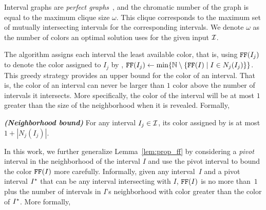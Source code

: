 Interval graphs are \emph{perfect graphs}~\cite{golumbic2004algorithmic}, and the chromatic number of the graph is equal to the maximum clique size $\omega$.
This clique corresponds to the maximum set of mutually intersecting intervals for the corresponding intervals.
We denote $\omega$ as the number of colors an optimal solution uses for the given input $\mathcal{I}$.


\medskip

The \ff algorithm assigns each interval the least available color, that is, using $\text{\texttt{FF}}(I_j)$ to denote the color assigned to $I_j$ by \ff,
$\text{\texttt{FF}}(I_j) \leftarrow \min \{ \mathbb{N} \setminus \{ \text{\texttt{FF}}(I) \mid I \in N_j(I_j) \} \}$.
%
This greedy strategy provides an upper bound for the color of an interval.
That is, the color of an interval can never be larger than $1$ color above the number of intervals it intersects.
More specifically, the color of the interval will be at most $1$ greater than the size of the neighborhood when it is revealed. 
Formally,

\begin{lemma}\emph{\textbf{(Neighborhood bound)}}
    \label{lem:prop_ff}
    For any interval $I_j \in \mathcal{I}$, its color assigned by \ff is at most $1 + |N_j(I_j)|$.
\end{lemma}

In this work, we further generalize Lemma~\ref{lem:prop_ff} by considering a \emph{pivot} interval in the neighborhood of the interval $I$ and use the pivot interval to bound the color $\text{\texttt{FF}}(I)$ more carefully.
Informally, given any interval~$I$ and a pivot interval $I^*$ that can be any interval intersecting with $I$, $\text{\texttt{FF}}(I)$ is no more than~$1$ plus the number of intervals in $I$'s neighborhood with color greater than the color of $I^*$. %
More formally,

